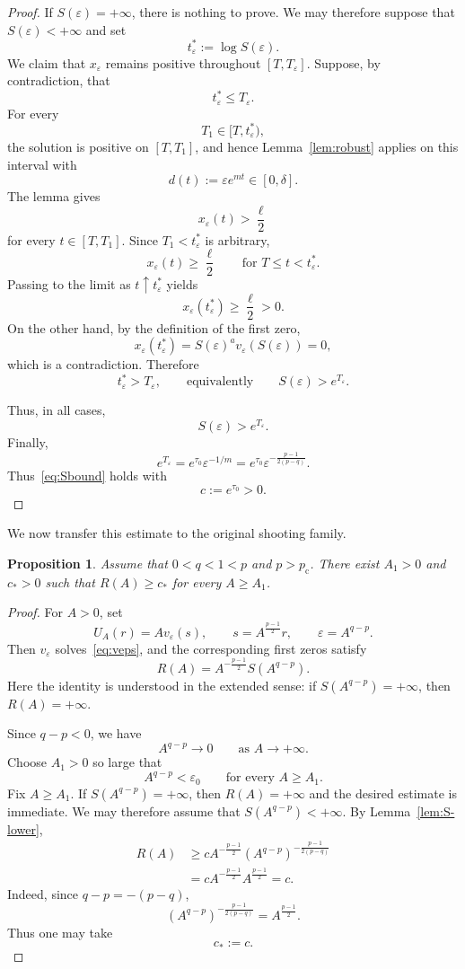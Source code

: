 \documentclass[11pt]{article}
\newcommand{\pc}{p_{\mathrm c}}
\newcommand{\oldrev}[1]{#1}
\newtheorem{proposition}[theorem]{Proposition}
\theoremstyle{definition}
\begin{document}
\begin{proof}
\oldrev{If $S(\varepsilon)=+\infty$, there is nothing to
prove. We may therefore suppose that $S(\varepsilon)<+\infty$ and
set
\[
t_\varepsilon^*:=\log S(\varepsilon).
\]}
We claim that $x_\varepsilon$ remains positive throughout
$[T,T_\varepsilon]$.
\oldrev{Suppose, by contradiction, that
\[
t_\varepsilon^*\leq T_\varepsilon.
\]
For every
\[
T_1\in[T,t_\varepsilon^*),
\]
the solution is positive on $[T,T_1]$, and hence
Lemma~\ref{lem:robust} applies on this interval with}
\[
d(t):=\varepsilon e^{mt}\in[0,\delta].
\]
The lemma gives
\[
x_\varepsilon(t)>\frac{\ell}{2}
\]
\oldrev{for every $t\in[T,T_1]$. Since $T_1<t_\varepsilon^*$
is arbitrary,}
\[
x_\varepsilon(t)\geq\frac{\ell}{2}
\qquad
\oldrev{\text{for }T\leq t<t_\varepsilon^*.}
\]
\oldrev{Passing to the limit as
$t\uparrow t_\varepsilon^*$ yields
\[
x_\varepsilon(t_\varepsilon^*)
\geq\frac{\ell}{2}>0.
\]
On the other hand, by the definition of the first zero,
\[
x_\varepsilon(t_\varepsilon^*)
=
S(\varepsilon)^a
v_\varepsilon(S(\varepsilon))
=0,
\]
which is a contradiction. Therefore
\[
t_\varepsilon^*>T_\varepsilon,
\qquad\text{equivalently}\qquad
S(\varepsilon)>e^{T_\varepsilon}.
\]}

\oldrev{Thus, in all cases,}
\[
S(\varepsilon)>e^{T_\varepsilon}.
\]
Finally,
\[
e^{T_\varepsilon}
=
e^{\tau_0}
\varepsilon^{-1/m}
=
e^{\tau_0}
\varepsilon^{-\frac{p-1}{2(p-q)}}.
\]
Thus~\eqref{eq:Sbound} holds with
\[
c:=e^{\tau_0}>0.
\]
\end{proof}

We now transfer this estimate to the original shooting family.

\begin{proposition}
\label{prop:largeA}
\oldrev{Assume that $0<q<1<p$ and $p>\pc$.}
There exist $A_1>0$ and $c_*>0$ such that
\(
R(A)\geq c_*
\)
for every \(A\geq A_1\).
\end{proposition}

\begin{proof}
For $A>0$, set
\[
U_A(r)
=
A v_\varepsilon(s),
\qquad
s=A^{\frac{p-1}{2}}r,
\qquad
\varepsilon=A^{q-p}.
\]
Then $v_\varepsilon$ solves~\eqref{eq:veps}, and the corresponding
first zeros satisfy
\begin{equation}
\label{eq:R-S}
R(A)
=
A^{-\frac{p-1}{2}}
S(A^{q-p}).
\end{equation}
\oldrev{Here the identity is understood in the extended
sense: if $S(A^{q-p})=+\infty$, then $R(A)=+\infty$.}

Since $q-p<0$, we have
\[
A^{q-p}\longrightarrow0
\qquad
\text{as }A\to+\infty.
\]
Choose $A_1>0$ so large that
\[
A^{q-p}<\varepsilon_0
\qquad
\text{for every }A\geq A_1.
\]
\oldrev{Fix $A\geq A_1$. If
$S(A^{q-p})=+\infty$, then $R(A)=+\infty$ and the desired estimate
is immediate. We may therefore assume that
$S(A^{q-p})<+\infty$.}
By Lemma~\ref{lem:S-lower},
\begin{align*}
R(A)
&\geq
c
A^{-\frac{p-1}{2}}
\left(A^{q-p}\right)^{-\frac{p-1}{2(p-q)}}
\\
&=
c
A^{-\frac{p-1}{2}}
A^{\frac{p-1}{2}}
=
c.
\end{align*}
\oldrev{Indeed, since $q-p=-(p-q)$,
\[
\left(A^{q-p}\right)^{-\frac{p-1}{2(p-q)}}
=
A^{\frac{p-1}{2}}.
\]}
Thus one may take
\[
c_*:=c.
\]
\end{proof}
\end{document}

